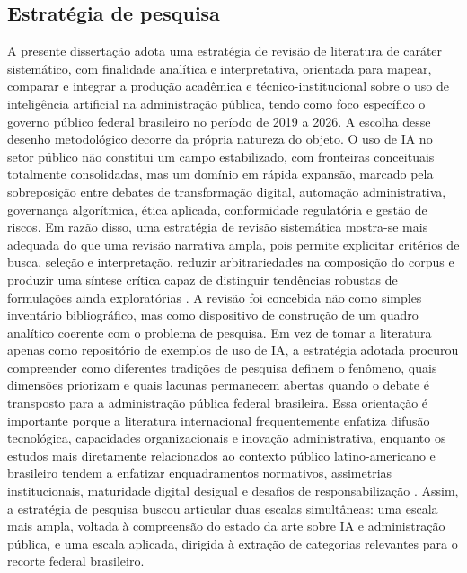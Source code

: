 \documentclass[12pt,a4paper]{article}
\begin{document}
\subsection{Estratégia de pesquisa}
\label{sec:org10a6d11}
A presente dissertação adota uma estratégia de revisão de literatura de caráter sistemático, com finalidade analítica e interpretativa, orientada para mapear, comparar e integrar a produção acadêmica e técnico-institucional sobre o uso de inteligência artificial na administração pública, tendo como foco específico o governo público federal brasileiro no período de 2019 a 2026. A escolha desse desenho metodológico decorre da própria natureza do objeto. O uso de IA no setor público não constitui um campo estabilizado, com fronteiras conceituais totalmente consolidadas, mas um domínio em rápida expansão, marcado pela sobreposição entre debates de transformação digital, automação administrativa, governança algorítmica, ética aplicada, conformidade regulatória e gestão de riscos. Em razão disso, uma estratégia de revisão sistemática mostra-se mais adequada do que uma revisão narrativa ampla, pois permite explicitar critérios de busca, seleção e interpretação, reduzir arbitrariedades na composição do corpus e produzir uma síntese crítica capaz de distinguir tendências robustas de formulações ainda exploratórias \autocite{prisma2020statement} \autocite{madan2022ai}.
A revisão foi concebida não como simples inventário bibliográfico, mas como dispositivo de construção de um quadro analítico coerente com o problema de pesquisa. Em vez de tomar a literatura apenas como repositório de exemplos de uso de IA, a estratégia adotada procurou compreender como diferentes tradições de pesquisa definem o fenômeno, quais dimensões priorizam e quais lacunas permanecem abertas quando o debate é transposto para a administração pública federal brasileira. Essa orientação é importante porque a literatura internacional frequentemente enfatiza difusão tecnológica, capacidades organizacionais e inovação administrativa, enquanto os estudos mais diretamente relacionados ao contexto público latino-americano e brasileiro tendem a enfatizar enquadramentos normativos, assimetrias institucionais, maturidade digital desigual e desafios de responsabilização \autocite{criado2024artificial} \autocite{criado2024inteligencia} \autocite{serra2024a}. Assim, a estratégia de pesquisa buscou articular duas escalas simultâneas: uma escala mais ampla, voltada à compreensão do estado da arte sobre IA e administração pública, e uma escala aplicada, dirigida à extração de categorias relevantes para o recorte federal brasileiro.
\end{document}
